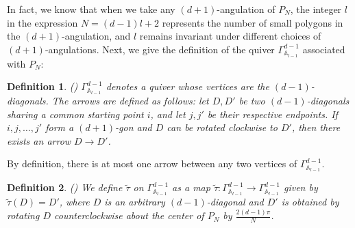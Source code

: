 \documentclass[12pt]{article}
\theoremstyle{plain}
\newtheorem{Def}{Definition}[section]
\theoremstyle{definition}
\begin{document}
In fact, we know that when we take any $(d+1)$-angulation of $P_{N}$, the integer $l$ in the expression $N = (d-1)l + 2$ represents the number of small polygons in the $(d+1)$-angulation, and $l$ remains invariant under different choices of $(d+1)$-angulations. Next, we give the definition of the quiver $\Gamma^{d-1}_{\mathbb{A}_{l-1}}$ associated with $P_{N}$:

\begin{Def}\textup{(\cite{BaurMarsh2008})}
$\Gamma^{d-1}_{\mathbb{A}_{l-1}}$ denotes a quiver whose vertices are the $(d-1)$-diagonals. The arrows are defined as follows: let $D, D'$ be two $(d-1)$-diagonals sharing a common starting point $i$, and let $j, j'$ be their respective endpoints. If $i, j, \ldots, j'$ form a $(d+1)$-gon and $D$ can be rotated clockwise to $D'$, then there exists an arrow $D \to D'$.
\end{Def}
By definition, there is at most one arrow between any two vertices of $\Gamma^{d-1}_{\mathbb{A}_{l-1}}$.

\begin{Def}\textup{(\cite{BaurMarsh2008})}
We define $\tilde{\tau}$ on $\Gamma^{d-1}_{\mathbb{A}_{l-1}}$ as a map $\tilde{\tau}: \Gamma^{d-1}_{\mathbb{A}_{l-1}} \to \Gamma^{d-1}_{\mathbb{A}_{l-1}}$ given by $\tilde{\tau}(D) = D'$, where $D$ is an arbitrary $(d-1)$-diagonal and $D'$ is obtained by rotating $D$ counterclockwise about the center of $P_{N}$ by $\frac{2(d-1)\pi}{N}$.
\end{Def}
\end{document}
